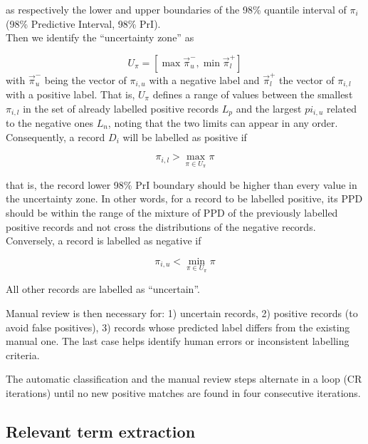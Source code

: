 \documentclass{article}
\begin{document}
as respectively the lower and upper boundaries of the 98\% quantile
interval of \(\pi_i\) (98\% Predictive Interval, 98\% PrI).\\
Then we identify the ``uncertainty zone'' as

\[U_\pi=[\max\vec{\pi}_{u}^-, \min\vec{\pi}_{l}^+]\] with
\(\vec{\pi}_{u}^-\) being the vector of \(\pi_{i,u}\) with a negative
label and \(\vec{\pi}_{l}^+\) the vector of \(\pi_{i,l}\) with a
positive label. That is, \(U_\pi\) defines a range of values between the
smallest \(\pi_{i,l}\) in the set of already labelled positive records
\(L_p\) and the largest \(pi_{i,u}\) related to the negative ones
\(L_n\), noting that the two limits can appear in any order.\\
Consequently, a record \(D_i\) will be labelled as positive if

\[\pi_{i,l} > \max_{\pi \in U_\pi} \pi\]

that is, the record lower 98\% PrI boundary should be higher than every
value in the uncertainty zone. In other words, for a record to be
labelled positive, its PPD should be within the range of the mixture of
PPD of the previously labelled positive records and not cross the
distributions of the negative records.\\
Conversely, a record is labelled as negative if

\[\pi_{i,u} < \min_{\pi \in U_\pi} \pi\]

All other records are labelled as ``uncertain''.

Manual review is then necessary for: 1) uncertain records, 2) positive
records (to avoid false positives), 3) records whose predicted label
differs from the existing manual one. The last case helps identify human
errors or inconsistent labelling criteria.

The automatic classification and the manual review steps alternate in a
loop (CR iterations) until no new positive matches are found in four
consecutive iterations.

\hypertarget{relevant-term-extraction}{%
\subsection{Relevant term extraction}\label{relevant-term-extraction}}
\end{document}
